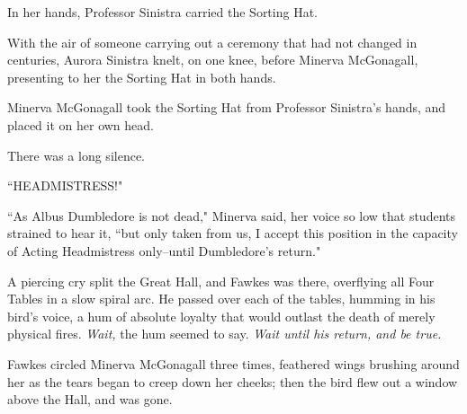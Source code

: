 In her hands, Professor Sinistra carried the Sorting Hat.

With the air of someone carrying out a ceremony that had not changed in centuries, Aurora Sinistra knelt, on one knee, before Minerva McGonagall, presenting to her the Sorting Hat in both hands.

Minerva McGonagall took the Sorting Hat from Professor Sinistra's hands, and placed it on her own head.

There was a long silence.

``HEADMISTRESS!"

``As Albus Dumbledore is not dead," Minerva said, her voice so low that students strained to hear it, ``but only taken from us, I accept this position in the capacity of Acting Headmistress only\---until Dumbledore's return."

A piercing cry split the Great Hall, and Fawkes was there, overflying all Four Tables in a slow spiral arc. He passed over each of the tables, humming in his bird's voice, a hum of absolute loyalty that would outlast the death of merely physical fires. \emph{Wait,} the hum seemed to say. \emph{Wait until his return, and be true.}

Fawkes circled Minerva McGonagall three times, feathered wings brushing around her as the tears began to creep down her cheeks; then the bird flew out a window above the Hall, and was gone.

